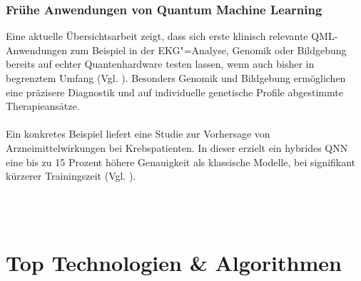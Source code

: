 \subsubsection*{Frühe Anwendungen von Quantum Machine Learning}
Eine aktuelle Übersichtsarbeit zeigt, dass sich erste klinisch relevante QML-Anwendungen zum Beispiel in der EKG"=Analyse, Genomik oder Bildgebung bereits auf echter Quantenhardware testen lassen, wenn auch bisher in begrenztem Umfang (Vgl. \cite{gupta_systematic_2025}). Besonders Genomik und Bildgebung ermöglichen eine präzisere Diagnostik und auf individuelle genetische Profile abgestimmte Therapieansätze.\\
\\
Ein konkretes Beispiel liefert eine Studie zur Vorhersage von Arzneimittelwirkungen bei Krebspatienten. In dieser erzielt ein hybrides QNN eine bis zu 15 Prozent höhere Genauigkeit als klassische Modelle, bei signifikant kürzerer Trainingszeit (Vgl. \cite{sagingalieva_hybrid_2023}).\\
\\
\begin{table}[ht]
\centering
\renewcommand{\arraystretch}{1.3}
\caption{Anwendungsfelder des Quantencomputings in der Medizin und Pharmazie}
\label{tab:qc_medizin}
\end{table}
\\


\section{Top Technologien \& Algorithmen}

